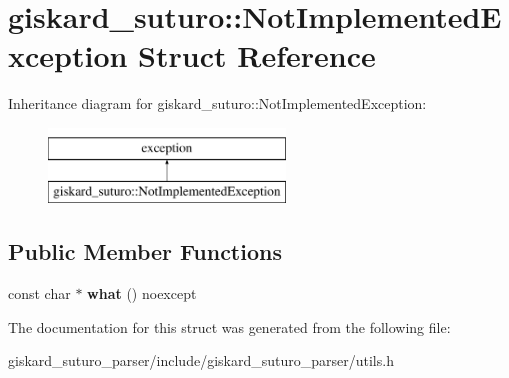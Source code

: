 \hypertarget{structgiskard__suturo_1_1NotImplementedException}{\section{giskard\-\_\-suturo\-:\-:Not\-Implemented\-Exception Struct Reference}
\label{structgiskard__suturo_1_1NotImplementedException}
}
Inheritance diagram for giskard\-\_\-suturo\-:\-:Not\-Implemented\-Exception\-:\begin{figure}[H]
\begin{center}
\leavevmode
\includegraphics[height=2.000000cm]{structgiskard__suturo_1_1NotImplementedException}
\end{center}
\end{figure}
\subsection*{Public Member Functions}
\begin{DoxyCompactItemize}
\item 
\hypertarget{structgiskard__suturo_1_1NotImplementedException_a821b94fe0ed0034c9d63e9f985b1aa97}{const char $\ast$ {\bfseries what} () noexcept}\label{structgiskard__suturo_1_1NotImplementedException_a821b94fe0ed0034c9d63e9f985b1aa97}

\end{DoxyCompactItemize}


The documentation for this struct was generated from the following file\-:\begin{DoxyCompactItemize}
\item 
giskard\-\_\-suturo\-\_\-parser/include/giskard\-\_\-suturo\-\_\-parser/utils.\-h\end{DoxyCompactItemize}
